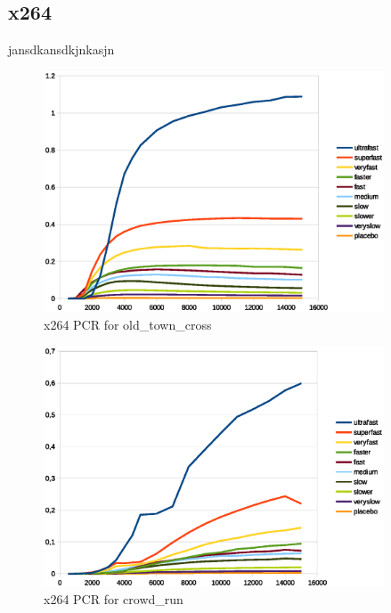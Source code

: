 \documentclass[12pt,twoside]{article}
\begin{document}
\subsection{x264}
jansdkansdkjnkasjn
\begin{figure}[!h]
	\vspace{-10pt}
	\centering
	\includegraphics[width=0.9\textwidth]{img/x264oldtTownCrossPCR.eps}
	\caption{x264 PCR for old\_town\_cross}
	\label{fig:x264oldtTownCrossPCR}
\end{figure}
\begin{figure}[!h]
	\vspace{-10pt}
	\centering
	\includegraphics[width=0.9\textwidth]{img/x264crowdRunPCR.eps}
	\caption{x264 PCR for crowd\_run}
	\label{fig:x264CrowdRunPCR}
\end{figure}
\end{document}
